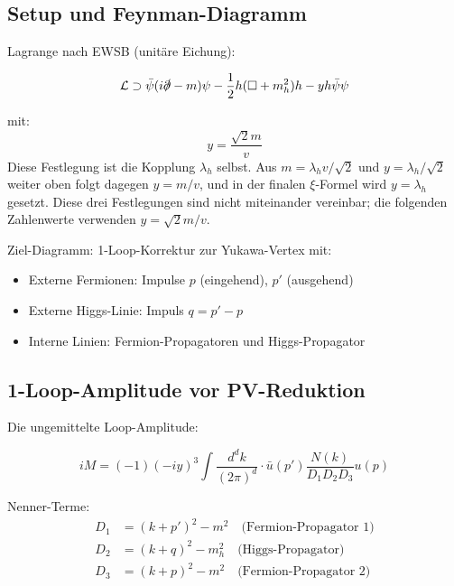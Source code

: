 	\subsection{Setup und Feynman-Diagramm}
	
	Lagrange nach EWSB (unitäre Eichung):
	
	\begin{equation}
		\mathcal{L} \supset \bar{\psi}(i\slashed{\partial} - m)\psi - \frac{1}{2}h(\Box + m_h^2)h - y h \bar{\psi}\psi
	\end{equation}
	
	mit:
	\begin{equation}
		y = \frac{\sqrt{2} m}{v}
	\end{equation}
	Diese Festlegung ist die Kopplung $\lambda_h$ selbst. Aus $m = \lambda_h v/\sqrt{2}$ und $y = \lambda_h/\sqrt{2}$ weiter oben folgt dagegen $y = m/v$, und in der finalen $\xi$-Formel wird $y = \lambda_h$ gesetzt. Diese drei Festlegungen sind nicht miteinander vereinbar; die folgenden Zahlenwerte verwenden $y = \sqrt{2}m/v$.
	
	Ziel-Diagramm: 1-Loop-Korrektur zur Yukawa-Vertex mit:
	\begin{itemize}
		\item Externe Fermionen: Impulse $p$ (eingehend), $p'$ (ausgehend)
		\item Externe Higgs-Linie: Impuls $q = p' - p$
		\item Interne Linien: Fermion-Propagatoren und Higgs-Propagator
	\end{itemize}
	
	\subsection{1-Loop-Amplitude vor PV-Reduktion}
	
	Die ungemittelte Loop-Amplitude:
	
	\begin{equation}
		iM = (-1)(-iy)^3 \int \frac{d^d k}{(2\pi)^d} \cdot \bar{u}(p') \frac{N(k)}{D_1 D_2 D_3} u(p)
	\end{equation}
	
	Nenner-Terme:
	\begin{align}
		D_1 &= (k + p')^2 - m^2 \quad \text{(Fermion-Propagator 1)}\\
		D_2 &= (k + q)^2 - m_h^2 \quad \text{(Higgs-Propagator)}\\
		D_3 &= (k + p)^2 - m^2 \quad \text{(Fermion-Propagator 2)}
	\end{align}
	

